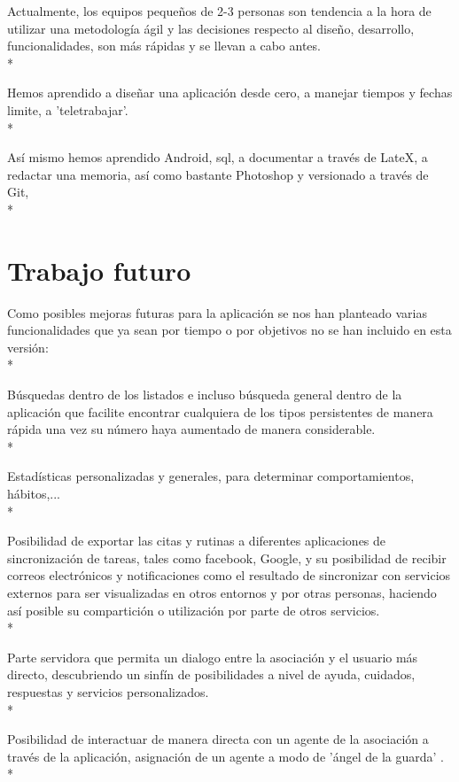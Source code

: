 \documentclass[../pfc.tex]{subfiles}
\begin{document}
	Actualmente, los equipos pequeños de 2-3 personas son tendencia a la hora de utilizar una metodología ágil y las decisiones respecto al diseño, desarrollo, funcionalidades, son más rápidas y se llevan a cabo antes.\\*
	
	Hemos aprendido a diseñar una aplicación desde cero, a manejar tiempos y fechas limite, a 'teletrabajar'.\\*
	
	Así mismo hemos aprendido Android, sql, a documentar a través de LateX, a redactar una memoria, así como bastante Photoshop y  versionado a través de Git,\\*
		
	
	\section{Trabajo futuro}
	
	Como posibles mejoras futuras para la aplicación se nos han planteado varias funcionalidades que ya sean por tiempo o por objetivos no se han incluido en esta versión:\\*	
	
	Búsquedas dentro de los listados e incluso búsqueda general dentro de la aplicación que facilite encontrar cualquiera de los tipos persistentes de manera rápida una vez su número haya aumentado de manera considerable.\\*
	
	Estadísticas personalizadas y generales, para determinar comportamientos, hábitos,...\\*
	
	Posibilidad de exportar las citas y rutinas a diferentes aplicaciones de sincronización de tareas, tales como facebook, Google, y su posibilidad de recibir correos electrónicos y notificaciones como el resultado de sincronizar con servicios externos para ser visualizadas en otros entornos y por otras personas, haciendo así posible su compartición o utilización por parte de otros servicios.\\*
	
	Parte servidora que permita un dialogo entre la asociación y el usuario más directo, descubriendo un sinfín de posibilidades a nivel de ayuda, cuidados, respuestas y servicios personalizados.\\*
	
	Posibilidad de interactuar de manera directa con un agente de la asociación a través de la aplicación, asignación de un agente a modo de 'ángel de la guarda' .\\*
	
\end{document}
